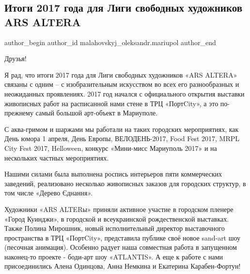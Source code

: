  
 
 
 
 
 
\subsection{Итоги 2017 года для Лиги свободных художников ARS ALTERA}
\label{sec:13_01_2018.fb.malahovskyj_oleksandr.mariupol.1.ars_altera}
 
\ifcmt
 author_begin
   author_id malahovskyj_oleksandr.mariupol
 author_end
\fi

Друзья!

Я рад, что итоги 2017 года для Лиги свободных художников «ARS ALTERA» связаны с
одним – с изобразительным искусством во всех его разнообразных и неожиданных
проявлениях. 2017 год начался с официального открытия выставки живописных работ
на расписанной нами стене в ТРЦ «ПортCity», а это по-прежнему самый большой
арт-объект в Мариуполе.

С аква-гримом и шаржами мы работали на таких городских мероприятиях, как День
юмора 1 апреля, День Европы, ВЕЛОДЕНЬ-2017, Food Fest 2017, MRPL City Fest
2017, Helloween, конкурс «Мини-мисс Мариуполь 2017» и на нескольких частных
мероприятиях.

Нашими силами была выполнена роспись интерьеров пяти коммерческих заведений,
реализовано несколько живописных заказов для городских структур, в том числе
«Дерево Єднання». 

Художники «ARS ALTERы» приняли активное участие в городском пленере «Город
Куинджи», в городской и всеукраинской рождественской выставках. Также Полина
Мирошник, новый исполнительный директор выставочного пространства в ТРЦ
«ПортCity», представила публике своё новое sand-art шоу (песочная анимация).
Особенно радует наша совместная работа в запущенном наконец-то проекте -
боди-арт шоу «ATLANTIS». А еще к работе с нами присоединились Алена Одинцова,
Анна Немкина и Екатерина Карабен-Фортун! 

